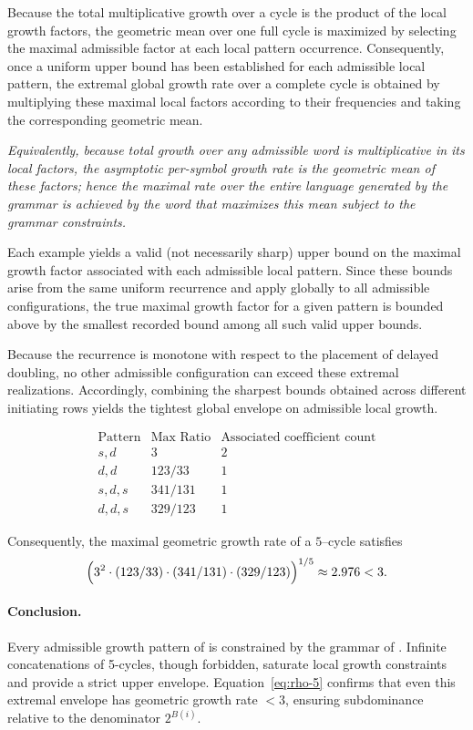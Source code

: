 \documentclass[12pt, oneside]{article}
\numberwithin{equation}{section}
\theoremstyle{definition}
\theoremstyle{plain}
\theoremstyle{remark}
\begin{document}
Because the total multiplicative growth over a cycle is the product of the local
growth factors, the geometric mean over one full cycle is maximized by selecting
the maximal admissible factor at each local pattern occurrence. Consequently,
once a uniform upper bound has been established for each admissible local pattern,
the extremal global growth rate over a complete cycle is obtained by multiplying
these maximal local factors according to their frequencies and taking the
corresponding geometric mean.

\emph{Equivalently, because total growth over any admissible word is multiplicative in
its local factors, the asymptotic per-symbol growth rate is the geometric mean of these
factors;  hence the maximal rate over the entire language generated by the grammar is
achieved by the word that maximizes this mean subject to the grammar constraints.}

Each example yields a valid (not necessarily sharp) upper bound on the maximal growth
factor associated with each admissible local pattern.  Since these bounds arise from
the same uniform recurrence and apply globally to all admissible configurations, the
true maximal growth factor for a given pattern is bounded above by the smallest
recorded bound among all such valid upper bounds.

Because the recurrence is monotone with respect to the placement of delayed doubling,
no other admissible configuration can exceed these extremal realizations.
Accordingly, combining the sharpest bounds obtained across different initiating
rows yields the tightest global envelope on admissible local growth.

\[
\begin{array}{c|c|c}
\text{Pattern} & \text{Max Ratio} & \text{Associated coefficient count} \\
\hline
s,d & 3 & 2 \\
d,d & 123/33 & 1 \\
s,d,s & 341/131 & 1 \\
d,d,s & 329/123 & 1
\end{array}
\]

Consequently, the maximal geometric growth rate of a $5$--cycle satisfies
\begin{equation}
\Bigl(
3^2 \cdot (123/33) \cdot (341/131) \cdot (329/123)
\Bigr)^{1/5} 
\approx 2.976 < 3.
\label{eq:rho-5}
\end{equation}

\paragraph{Conclusion.}
Every admissible growth pattern of  is constrained by the grammar
of . Infinite concatenations of 5-cycles, though forbidden, saturate
local growth constraints and provide a strict upper envelope. Equation~\eqref{eq:rho-5}
confirms that even this extremal envelope has geometric growth rate $< 3$, ensuring
subdominance relative to the denominator $2^{B(i)}$.
\end{document}
